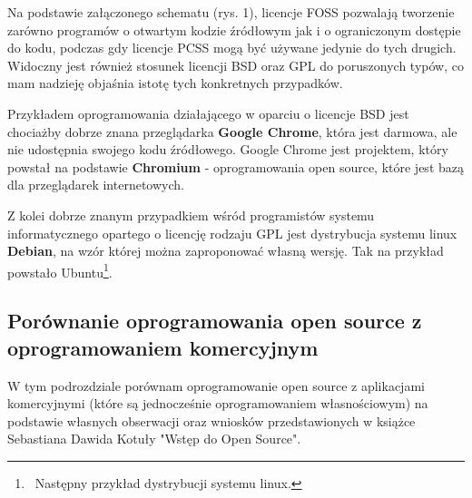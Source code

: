 \documentclass{article}
\begin{document}
Na podstawie załączonego schematu (rys. 1), licencje FOSS pozwalają tworzenie zarówno programów o otwartym kodzie źródłowym jak i o ograniczonym dostępie do kodu, podczas gdy licencje PCSS mogą być używane jedynie do tych drugich. Widoczny jest również stosunek licencji BSD oraz GPL do poruszonych typów, co mam nadzieję objaśnia istotę tych konkretnych przypadków.

Przykładem oprogramowania działającego w oparciu o licencje BSD jest chociażby dobrze znana przeglądarka \textbf{Google Chrome}, która jest darmowa, ale nie udostępnia swojego kodu źródłowego. Google Chrome jest projektem, który powstał na podstawie \textbf{Chromium} - oprogramowania open source, które jest bazą dla przeglądarek internetowych\cite{wikipedia}.

Z kolei dobrze znanym przypadkiem wśród programistów systemu informatycznego opartego o licencję rodzaju GPL jest dystrybucja systemu linux \textbf{Debian}, na wzór której można zaproponować własną wersję\cite{Kotula}. Tak na przykład powstało Ubuntu\footnote{\, Następny przykład dystrybucji systemu linux.}. \newpage

\subsection{Porównanie oprogramowania open source z oprogramowaniem komercyjnym}

W tym podrozdziale porównam oprogramowanie open source z aplikacjami komercyjnymi (które są jednocześnie oprogramowaniem własnościowym) na podstawie własnych obserwacji oraz wniosków przedstawionych w książce Sebastiana Dawida Kotuły "Wstęp do Open Source".
\end{document}
